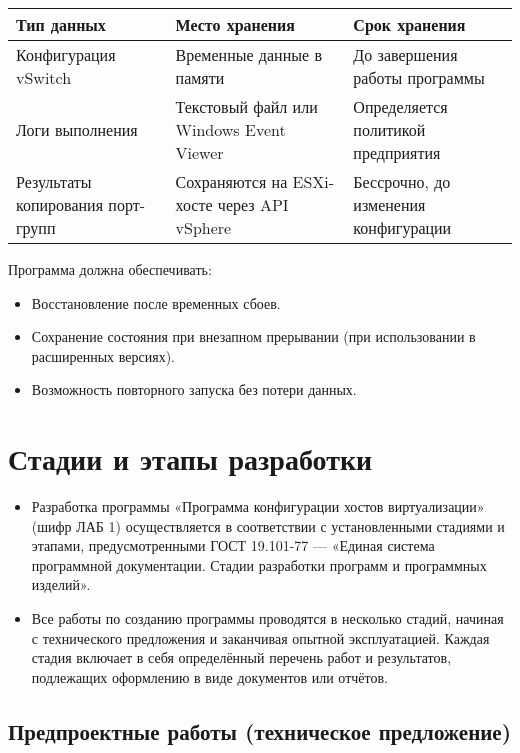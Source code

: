 \begin{table}[h]
\centering
\begin{tabular}{|p{5cm}|p{5cm}|p{5cm}|}
\hline
\textbf{Тип данных} & \textbf{Место хранения} & \textbf{Срок хранения} \\ \hline
Конфигурация vSwitch & Временные данные в памяти & До завершения работы программы \\ \hline
Логи выполнения & Текстовый файл или Windows Event Viewer & Определяется политикой предприятия \\ \hline
Результаты копирования порт-групп & Сохраняются на ESXi-хосте через API vSphere & Бессрочно, до изменения конфигурации \\ \hline
\end{tabular}
\end{table}

Программа должна обеспечивать:

\begin{itemize}
    \item Восстановление после временных сбоев.
    \item Сохранение состояния при внезапном прерывании (при использовании в расширенных версиях).
    \item Возможность повторного запуска без потери данных.
\end{itemize}

\section{Стадии и этапы разработки}

\begin{itemize}
    \item Разработка программы «Программа конфигурации хостов виртуализации» (шифр ЛАБ 1) осуществляется в соответствии с установленными стадиями и этапами, предусмотренными ГОСТ 19.101-77 — «Единая система программной документации. Стадии разработки программ и программных изделий».
    
    \item Все работы по созданию программы проводятся в несколько стадий, начиная с технического предложения и заканчивая опытной эксплуатацией. Каждая стадия включает в себя определённый перечень работ и результатов, подлежащих оформлению в виде документов или отчётов.
\end{itemize}

\subsection{Предпроектные работы (техническое предложение)}


